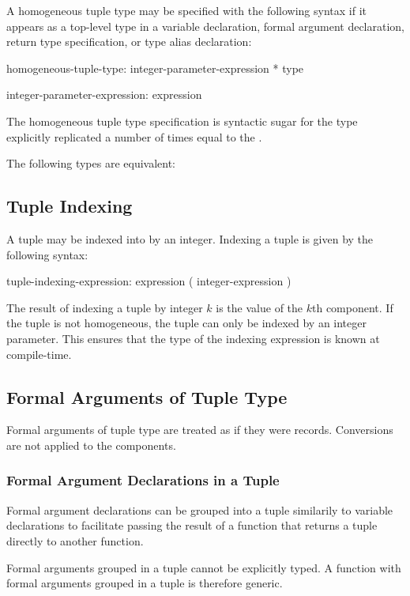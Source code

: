 A homogeneous tuple type may be specified with the following syntax if
it appears as a top-level type in a variable declaration, formal
argument declaration, return type specification, or type alias
declaration:
\begin{syntax}
homogeneous-tuple-type:
  integer-parameter-expression * type

integer-parameter-expression:
  expression
\end{syntax}
The homogeneous tuple type specification is syntactic sugar for the
type explicitly replicated a number of times equal to the
.
\begin{example}
The following types are equivalent:
\begin{center}
 \hspace{2pc} 
\end{center}
\end{example}

\subsection{Tuple Indexing}
\label{Tuple_Indexing}

A tuple may be indexed into by an integer.  Indexing a tuple is given
by the following syntax:
\begin{syntax}
tuple-indexing-expression:
  expression ( integer-expression )
\end{syntax}

The result of indexing a tuple by integer $k$ is the value of the
$k$th component.  If the tuple is not homogeneous, the tuple can only
be indexed by an integer parameter.  This ensures that the type of the
indexing expression is known at compile-time.

\subsection{Formal Arguments of Tuple Type}
\label{Formal_Arguments_of_Tuple_Type}


\begin{status}
Formal arguments of tuple type are treated as if they were records.
Conversions are not applied to the components.
\end{status}

\subsubsection{Formal Argument Declarations in a Tuple}
\label{Formal_Argument_Declarations_in_a_Tuple}

Formal argument declarations can be grouped into a tuple similarily to
variable declarations to facilitate passing the result of a function that
returns a tuple directly to another function.

\begin{status}Formal arguments grouped in a tuple cannot be explicitly
typed. A function with formal arguments grouped in a tuple is
therefore generic.
\end{status}
